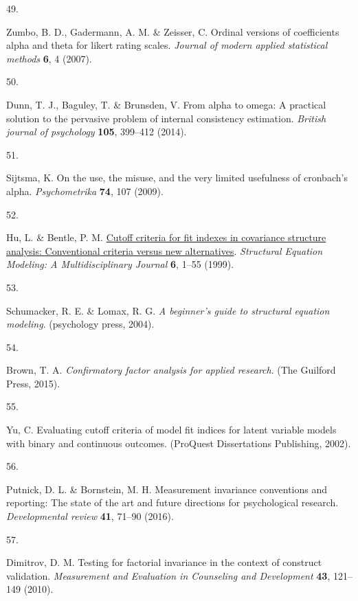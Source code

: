 \documentclass[
  man]{apa6}
\newlength{\cslhangindent}
\newlength{\csllabelwidth}
\newlength{\cslentryspacingunit} %
\newenvironment{CSLReferences}[2] %
 {%
  \setlength{\parindent}{0pt}
  \ifodd #1
  \let\oldpar\par
  \def\par{\hangindent=\cslhangindent\oldpar}
  \fi
  \setlength{\parskip}{#2\cslentryspacingunit}
 }%
 {}
\newcommand{\CSLLeftMargin}[1]{\parbox[t]{\csllabelwidth}{#1}}
\newcommand{\CSLRightInline}[1]{\parbox[t]{\linewidth - \csllabelwidth}{#1}\break}
\begin{document}
\begin{CSLReferences}{0}{0}
\leavevmode{}%
\CSLLeftMargin{49. }%
\CSLRightInline{Zumbo, B. D., Gadermann, A. M. \& Zeisser, C. Ordinal versions of coefficients alpha and theta for likert rating scales. \emph{Journal of modern applied statistical methods} \textbf{6}, 4 (2007).}

\leavevmode{}%
\CSLLeftMargin{50. }%
\CSLRightInline{Dunn, T. J., Baguley, T. \& Brunsden, V. From alpha to omega: A practical solution to the pervasive problem of internal consistency estimation. \emph{British journal of psychology} \textbf{105}, 399--412 (2014).}

\leavevmode{}%
\CSLLeftMargin{51. }%
\CSLRightInline{Sijtsma, K. On the use, the misuse, and the very limited usefulness of cronbach's alpha. \emph{Psychometrika} \textbf{74}, 107 (2009).}

\leavevmode{}%
\CSLLeftMargin{52. }%
\CSLRightInline{Hu, L. \& Bentle, P. M. \href{https://doi.org/10.1080/10705519909540118}{Cutoff criteria for fit indexes in covariance structure analysis: {Conventional} criteria versus new alternatives}. \emph{Structural Equation Modeling: A Multidisciplinary Journal} \textbf{6}, 1--55 (1999).}

\leavevmode{}%
\CSLLeftMargin{53. }%
\CSLRightInline{Schumacker, R. E. \& Lomax, R. G. \emph{A beginner's guide to structural equation modeling}. (psychology press, 2004).}

\leavevmode{}%
\CSLLeftMargin{54. }%
\CSLRightInline{Brown, T. A. \emph{Confirmatory factor analysis for applied research}. ({The Guilford Press}, 2015).}

\leavevmode{}%
\CSLLeftMargin{55. }%
\CSLRightInline{Yu, C. Evaluating cutoff criteria of model fit indices for latent variable models with binary and continuous outcomes. ({ProQuest Dissertations Publishing}, 2002).}

\leavevmode{}%
\CSLLeftMargin{56. }%
\CSLRightInline{Putnick, D. L. \& Bornstein, M. H. Measurement invariance conventions and reporting: The state of the art and future directions for psychological research. \emph{Developmental review} \textbf{41}, 71--90 (2016).}

\leavevmode{}%
\CSLLeftMargin{57. }%
\CSLRightInline{Dimitrov, D. M. Testing for factorial invariance in the context of construct validation. \emph{Measurement and Evaluation in Counseling and Development} \textbf{43}, 121--149 (2010).}


\end{CSLReferences}
\end{document}
